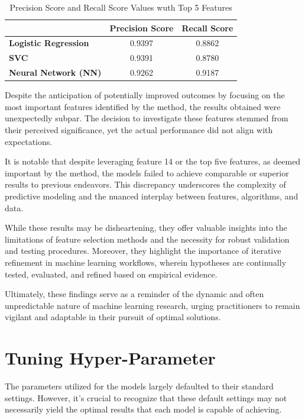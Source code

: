 \documentclass[conference]{IEEEtran}
\begin{document}
\begin{table}[H]
\centering
\begin{tabular}{@{}lcc@{}}
\toprule
\textbf{} & \textbf{Precision Score} & \textbf{Recall Score} \\ \midrule
\textbf{Logistic Regression} & 0.9397 & 0.8862 \\
\textbf{SVC} & 0.9391 & 0.8780 \\
\textbf{Neural Network (NN)} & 0.9262 & 0.9187 \\ \bottomrule
\end{tabular}
\caption{Precision Score and Recall Score Values wuth Top 5 Features}
\label{tab:svm-comparison}
\end{table}

Despite the anticipation of potentially improved outcomes by focusing on the most important features identified by the method, the results obtained were unexpectedly subpar. The decision to investigate these features stemmed from their perceived significance, yet the actual performance did not align with expectations. 

It is notable that despite leveraging feature 14 or the top five features, as deemed important by the method, the models failed to achieve comparable or superior results to previous endeavors. This discrepancy underscores the complexity of predictive modeling and the nuanced interplay between features, algorithms, and data.

While these results may be disheartening, they offer valuable insights into the limitations of feature selection methods and the necessity for robust validation and testing procedures. Moreover, they highlight the importance of iterative refinement in machine learning workflows, wherein hypotheses are continually tested, evaluated, and refined based on empirical evidence.

Ultimately, these findings serve as a reminder of the dynamic and often unpredictable nature of machine learning research, urging practitioners to remain vigilant and adaptable in their pursuit of optimal solutions.

\section{Tuning Hyper-Parameter}

The parameters utilized for the models largely defaulted to their standard settings. However, it's crucial to recognize that these default settings may not necessarily yield the optimal results that each model is capable of achieving.
\end{document}

